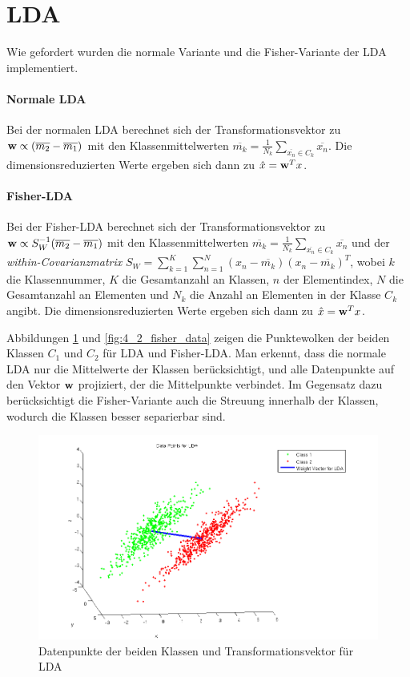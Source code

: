 \section{LDA}

Wie gefordert wurden die normale Variante und die Fisher-Variante der LDA implementiert.

\paragraph{Normale LDA}
Bei der normalen LDA berechnet sich der Transformationsvektor zu $\mathbf{w} \propto (\overline{m_2} - \overline{m_1})$ mit den Klassenmittelwerten $\overline{m_k} = \frac{1}{N_k} \sum_{\overline{x_n} \in C_k} \overline{x_n}$. Die dimensionsreduzierten Werte ergeben sich dann zu $\hat{x} = \mathbf{w}^T x$.

\paragraph{Fisher-LDA}
Bei der Fisher-LDA berechnet sich der Transformationsvektor zu $\mathbf{w} \propto S_W^{-1} (\overline{m_2} - \overline{m_1})$ mit den Klassenmittelwerten $\overline{m_k} = \frac{1}{N_k} \sum_{\overline{x_n} \in C_k} \overline{x_n}$ und der \emph{within-Covarianzmatrix} $S_W = \sum_{k = 1}^K \sum_{n = 1}^N (x_n - \overline{m_k}) (x_n - \overline{m_k})^T$, wobei $k$ die Klassennummer, $K$ die Gesamtanzahl an Klassen, $n$ der Elementindex, $N$ die Gesamtanzahl an Elementen und $N_k$ die Anzahl an Elementen in der Klasse $C_k$ angibt. Die dimensionsreduzierten Werte ergeben sich dann zu $\hat{x} = \mathbf{w}^T x$.


Abbildungen \ref{fig:4_2_lda_data} und \ref{fig:4_2_fisher_data} zeigen die Punktewolken der beiden Klassen $C_1$ und $C_2$ für LDA und Fisher-LDA. Man erkennt, dass die normale LDA nur die Mittelwerte der Klassen berücksichtigt, und alle Datenpunkte auf den Vektor $\mathbf{w}$ projiziert, der die Mittelpunkte verbindet. Im Gegensatz dazu berücksichtigt die Fisher-Variante auch die Streuung innerhalb der Klassen, wodurch die Klassen besser separierbar sind.

\begin{figure}[hp!]
\begin{center}
 \includegraphics[width=\textwidth]{./figures/4_2_lda_data}
 \caption{Datenpunkte der beiden Klassen und Transformationsvektor für LDA}
\label{fig:4_2_lda_data}
\end{center}
\end{figure}

